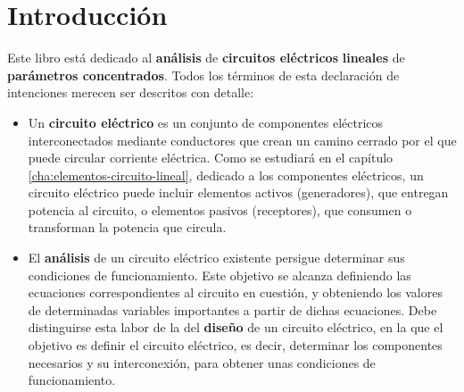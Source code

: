 \chapter{Introducción}
\label{cha:intro}
Este libro está dedicado al \textbf{análisis} de \textbf{circuitos eléctricos} \textbf{lineales} de \textbf{parámetros concentrados}. Todos los términos de esta declaración de intenciones merecen ser descritos con detalle:

\begin{itemize}
  
\item Un \textbf{circuito eléctrico} es un conjunto de componentes eléctricos interconectados mediante conductores que crean un camino cerrado por el que puede circular corriente eléctrica. Como se estudiará en el capítulo \ref{cha:elementos-circuito-lineal}, dedicado a los componentes eléctricos, un circuito eléctrico puede incluir elementos activos (generadores), que entregan potencia al circuito, o elementos pasivos (receptores), que consumen o transforman la potencia que circula.
  
\item El \textbf{análisis} de un circuito eléctrico existente persigue determinar sus condiciones de funcionamiento. Este objetivo se alcanza definiendo las ecuaciones correspondientes al circuito en cuestión, y obteniendo los valores de determinadas variables importantes a partir de dichas ecuaciones. Debe distinguirse esta labor de la del \textbf{diseño} de un circuito eléctrico, en la que el objetivo es definir el circuito eléctrico, es decir, determinar los componentes necesarios y su interconexión, para obtener unas condiciones de funcionamiento. 


\end{itemize}
